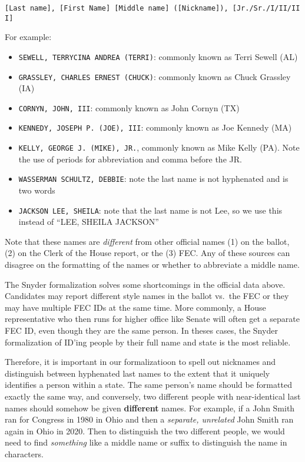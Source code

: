 \documentclass[12pt]{article}
\begin{document}
\begin{itemize}[leftmargin=*]
\texttt{{[}Last\ name{]},\ {[}First\ Name{]}\ {[}Middle\ name{]}\ ({[}Nickname{]}),\ {[}Jr./Sr./I/II/III{]}}

For example:

\begin{itemize}
\tightlist
\item
  \texttt{SEWELL,\ TERRYCINA\ ANDREA\ (TERRI)}: commonly known as Terri
  Sewell (AL)
\item
  \texttt{GRASSLEY,\ CHARLES\ ERNEST\ (CHUCK)}: commonly known as Chuck
  Grassley (IA)
\item
  \texttt{CORNYN,\ JOHN,\ III}: commonly known as John Cornyn (TX)
\item
  \texttt{KENNEDY,\ JOSEPH\ P.\ (JOE),\ III}: commonly known as Joe
  Kennedy (MA)
\item
  \texttt{KELLY,\ GEORGE\ J.\ (MIKE),\ JR.}, commonly known as Mike
  Kelly (PA). Note the use of periods for abbreviation and comma before
  the JR.
\item
  \texttt{WASSERMAN\ SCHULTZ,\ DEBBIE}: note the last name is not
  hyphenated and is two words
\item
  \texttt{JACKSON\ LEE,\ SHEILA}: note that the last name is not Lee, so
  we use this instead of ``LEE, SHEILA JACKSON''
\end{itemize}

Note that these names are \emph{different} from other official names (1)
on the ballot, (2) on the Clerk of the House report, or the (3) FEC. Any
of these sources can disagree on the formatting of the names or whether
to abbreviate a middle name.

The Snyder formalization solves some shortcomings in the official data
above. Candidates may report different style names in the ballot vs.~the
FEC or they may have multiple FEC IDs at the same time. More commonly, a
House representative who then runs for higher office like Senate will
often get a separate FEC ID, even though they are the same person. In
theses cases, the Snyder formalization of ID'ing people by their full
name and state is the most reliable.

Therefore, it is important in our formalizatioon to spell out nicknames
and distinguish between hyphenated last names to the extent that it
uniquely identifies a person within a state. The same person's name
should be formatted exactly the same way, and conversely, two different
people with near-identical last names should somehow be given
\textbf{different} names. For example, if a John Smith ran for Congress
in 1980 in Ohio and then a \emph{separate, unrelated} John Smith ran
again in Ohio in 2020. Then to distinguish the two different people, we
would need to find \emph{something} like a middle name or suffix to
distinguish the name in characters.


\end{itemize}
\end{document}

